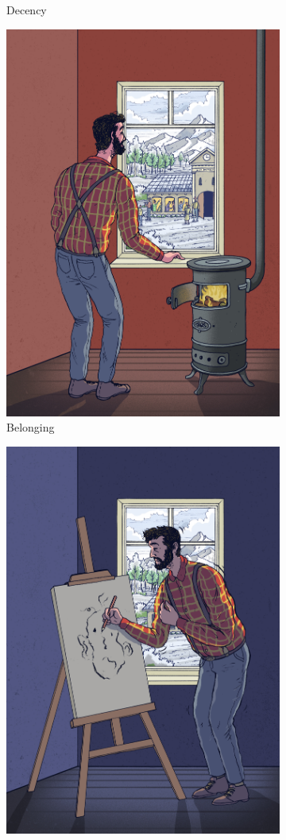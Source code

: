 \documentclass[10pt,letterpaper]{article}
\begin{document}
\begin{figure}[ht!]
\begin{subfigure}[t]{0.5\textwidth}
      \caption{Decency}\label{fig:illu_decency}
   \end{subfigure}
   \begin{subfigure}[t]{0.5\textwidth}
      \centering
      \includegraphics[width=0.8\linewidth]{figures/figure_1_c.jpg}
      \caption{Belonging}\label{fig:illu_belonging}
   \end{subfigure}
   \hfill
   \begin{subfigure}[t]{0.5\textwidth}
      \centering
      \includegraphics[width=0.8\linewidth]{figures/figure_1_d.jpg}

\end{subfigure}
\end{figure}
\end{document}
